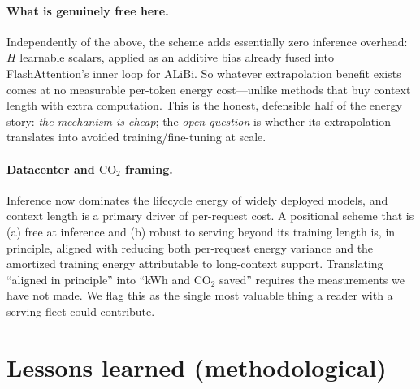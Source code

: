 \documentclass[11pt,a4paper]{article}
\begin{document}
\paragraph{What is genuinely free here.} Independently of the above, the scheme
adds essentially zero inference overhead: $H$ learnable scalars, applied as an
additive bias already fused into FlashAttention's inner loop for ALiBi. So
whatever extrapolation benefit exists comes at no measurable per-token energy
cost---unlike methods that buy context length with extra computation. This is the
honest, defensible half of the energy story: \emph{the mechanism is cheap}; the
\emph{open question} is whether its extrapolation translates into avoided
training/fine-tuning at scale.

\paragraph{Datacenter and $\mathrm{CO_2}$ framing.} Inference now dominates the
lifecycle energy of widely deployed models, and context length is a primary
driver of per-request cost. A positional scheme that is (a) free at inference and
(b) robust to serving beyond its training length is, in principle, aligned with
reducing both per-request energy variance and the amortized training energy
attributable to long-context support. Translating ``aligned in principle'' into
``kWh and $\mathrm{CO_2}$ saved'' requires the measurements we have not made. We
flag this as the single most valuable thing a reader with a serving fleet could
contribute.

\section{Lessons learned (methodological)}
\label{sec:lessons}
\end{document}
